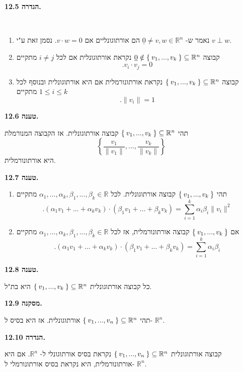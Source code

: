 \documentclass[12pt]{report}
\theoremstyle{plain}
\theoremstyle{definition}
\newcommand{\R}{\mathbb{R}}
\newcommand{\0}{\mathbf{0}}
\begin{document}
\noindent\textbf{הגדרה 12.5.}

\
\begin{enumerate}[label=\alph*.]
\item 
נאמר ש-
$\underline{0}\neq v,w\in\R^n$
הם אורתוגונליים אם
$v\cdot w=0$.
נסמן זאת ע"י 
$v\perp w$.


\item 
קבוצה
$\underline{0}\notin \Set{v_1,...,v_k}\subseteq\R^n$
נקראת אורתוגונלית אם לכל 
$i\neq j$
מתקיים
$$
.v_i\cdot v_j=0
$$


\item 
קבוצה
$\Set{v_1,...,v_k}\subseteq\R^n$
נקראת אורתונורמלית אם היא אורתוגונלית ובנוסף לכל 
$1\leq i\leq k$
מתקיים
$$
.\|v_i\|=1
$$


\end{enumerate}
\bigskip
\bigskip

\noindent\textbf{טענה 12.6.}

תהי
$\Set{v_1,...,v_k}\subseteq\R^n$
קבוצה אורתוגונלית. אז הקבוצה המנורמלת
$$
\left\{\frac{v_1}{\|v_1\|},...,\frac{v_k}{\|v_k\|}\right\}
$$
היא אורתונורמלית.
\bigskip
\bigskip

\noindent\textbf{טענה 12.7.}

\begin{enumerate}[label=\alph*.]
\item
תהי
$\Set{v_1,...,v_k}$
קבוצה אורתוגונלית. לכל
$\alpha_1,...,\alpha_k,\beta_1,...,\beta_k\in\R$
מתקיים
$$
.(\alpha_1v_1+...+\alpha_kv_k)\cdot(\beta_1v_1+...+\beta_kv_k)=\sum_{i=1}^k\alpha_i\beta_i\|v_i\|^2
$$


\item
אם
$\Set{v_1,...,v_k}$
קבוצה אורתונורמלית, אז לכל
$\alpha_1,...,\alpha_k,\beta_1,...,\beta_k\in\R$
מתקיים
$$
.(\alpha_1v_1+...+\alpha_kv_k)\cdot(\beta_1v_1+...+\beta_kv_k)=\sum_{i=1}^k\alpha_i\beta_i
$$


\end{enumerate}
\bigskip
\bigskip

\noindent\textbf{טענה 12.8.}

כל קבוצה אורתוגונלית
$\Set{v_1,...,v_k}\subseteq \R^n$
היא בת"ל.
\bigskip
\bigskip

\noindent\textbf{מסקנה 12.9.}

תהי
$\Set{v_1,...,v_n}\subseteq\R^n$
אורתוגונלית. אז היא בסיס ל-
$\R^n$.
\bigskip
\bigskip

\noindent\textbf{הגדרה 12.10.}

קבוצה אורתוגונלית 
$\Set{v_1,...,v_n}\subseteq\R^n$
נקראת בסיס אורתוגונלי ל-
$\R^n$.
אם היא אורתונורמלית, היא נקראת בסיס אורתונורמלי ל-
$\R^n$.
\bigskip
\bigskip
\end{document}
